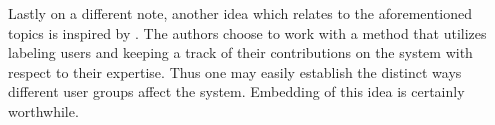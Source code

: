 \documentclass{article}
\begin{document}
Lastly on a different note, another idea which relates to the aforementioned topics is inspired by \cite{maudetComma}. The authors choose to work with a method that utilizes labeling users and keeping a track of their contributions on the system with respect to their expertise. Thus one may easily establish the distinct ways different user groups affect the system. Embedding of this idea is certainly worthwhile.





\end{document}
